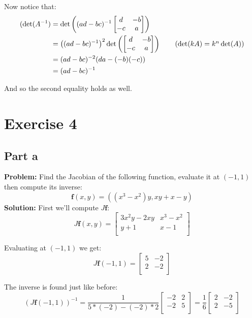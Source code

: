 \documentclass{article}
\begin{document}
Now notice that:
\begin{align*}(\operatorname{det}(A^{-1})&=\operatorname{det}
\left((ad-bc)^{-1}\begin{bmatrix}
    d & -b \\
    -c & a \\
\end{bmatrix}\right)\\
&=\left((ad-bc)^{-1}\right)^2\operatorname{det}\left(
\begin{bmatrix}
    d & -b \\
    -c & a \\
\end{bmatrix}\right)\tag{$\operatorname{det}(kA)=k^n\operatorname{det}(A)$}\\
&=(ad-bc)^{-2}(da-(-b)(-c))\\
&=(ad-bc)^{-1}
\end{align*}

And so the second equality holds as well.

\section*{Exercise 4}
\subsection*{Part a}
\textbf{Problem:} Find the Jacobian of the following function, evaluate it at $(-1,1)$ then compute its inverse:
$$\mathbf f(x,y)=((x^3-x^2)y,xy+x-y)$$
\textbf{Solution:} First we'll compute $J\mathbf f$:
$$J\mathbf f(x,y)=
\begin{bmatrix}
    3x^2y-2xy & x^3-x^2 \\
    y+1 & x-1 \\
\end{bmatrix}$$

Evaluating at $(-1,1)$ we get:
$$J\mathbf f(-1,1)=
\begin{bmatrix}
    5 & -2 \\
    2 & -2 \\
\end{bmatrix}$$

The inverse is found just like before:
$$(J\mathbf f(-1,1))^{-1}=
\frac{1}{5*(-2)-(-2)*2}\begin{bmatrix}
    -2 & 2 \\
    -2 & 5 \\
\end{bmatrix}=
\frac{1}{6}\begin{bmatrix}
    2 & -2 \\
    2 & -5 \\
\end{bmatrix}$$
\end{document}
